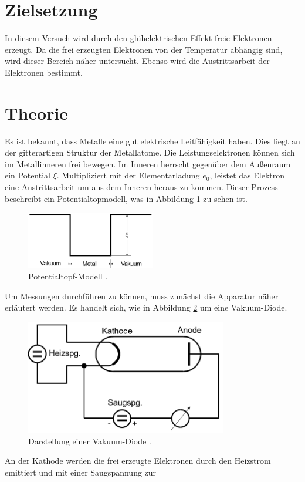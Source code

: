 \section{Zielsetzung}
In diesem Versuch wird durch den glühelektrischen Effekt freie Elektronen erzeugt. Da die frei erzeugten Elektronen von der Temperatur
abhängig sind, wird dieser Bereich näher untersucht. Ebenso wird die Austrittsarbeit der Elektronen bestimmt.
\section{Theorie}
Es ist bekannt, dass Metalle eine gut elektrische Leitfähigkeit haben. Dies liegt an der gitterartigen Struktur der Metallatome.
Die Leistungselektronen können sich im Metallinneren frei bewegen. Im Inneren herrscht gegenüber dem
Außenraum ein Potential $\xi$. Multipliziert mit der Elementarladung $e_0$, leistet das Elektron eine Austrittsarbeit um
aus dem Inneren heraus zu kommen.
Dieser Prozess beschreibt ein Potentialtopmodell, was in Abbildung \ref{abb:1} zu sehen ist.
\begin{figure}[H]
  \centering
  \includegraphics[width=5 cm, height= 2.5cm]{content/Potentialtopf.png}
  \caption{Potentialtopf-Modell \cite{1}.}
  \label{abb:1}
\end{figure}
Um Messungen durchführen zu können, muss zunächst die Apparatur näher erläutert werden.
Es handelt sich, wie in  Abbildung \ref{abb:2} um eine Vakuum-Diode.
\begin{figure}[H]
  \centering
  \includegraphics[width=10 cm, height =5cm]{content/Aufbau.png}
  \caption{Darstellung einer Vakuum-Diode \cite{1}.}
  \label{abb:2}
\end{figure}
An der Kathode werden die frei erzeugte Elektronen durch den Heizstrom emittiert und mit einer Saugspannung zur

